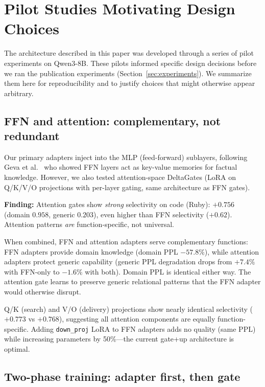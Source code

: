 \documentclass{article}
\begin{document}
\section{Pilot Studies Motivating Design Choices}
\label{sec:appendix-pilots}

The architecture described in this paper was developed through a series
of pilot experiments on Qwen3-8B. These pilots informed specific design
decisions before we ran the publication experiments (Section~\ref{sec:experiments}).
We summarize them here for reproducibility and to justify choices that
might otherwise appear arbitrary.

\subsection{FFN and attention: complementary, not redundant}
\label{sec:pilot-mlp}

Our primary adapters inject into the MLP (feed-forward) sublayers,
following Geva et al.~\cite{geva2021transformer} who showed FFN layers
act as key-value memories for factual knowledge. However, we also
tested attention-space DeltaGates (LoRA on Q/K/V/O projections with
per-layer gating, same architecture as FFN gates).

\textbf{Finding:} Attention gates show \emph{strong} selectivity
on code (Ruby): $+0.756$ (domain $0.958$, generic $0.203$), even
higher than FFN selectivity ($+0.62$). Attention patterns \emph{are}
function-specific, not universal.

When combined, FFN and attention adapters serve complementary functions:
FFN adapters provide domain knowledge (domain PPL $-57.8\%$), while
attention adapters protect generic capability (generic PPL degradation
drops from $+7.4\%$ with FFN-only to $-1.6\%$ with both). Domain PPL
is identical either way. The attention gate learns to preserve
generic relational patterns that the FFN adapter would otherwise
disrupt.

Q/K (search) and V/O (delivery) projections show nearly identical
selectivity ($+0.773$ vs $+0.768$), suggesting all attention
components are equally function-specific. Adding \texttt{down\_proj}
LoRA to FFN adapters adds no quality (same PPL) while increasing
parameters by 50\%---the current gate+up architecture is optimal.

\subsection{Two-phase training: adapter first, then gate}
\label{sec:pilot-twophase}
\end{document}
